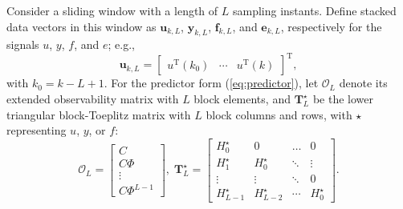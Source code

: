\documentclass[twocolumn]{autart}
\begin{document}
Consider a sliding window with a length of $L$ sampling instants. Define stacked data vectors in this window as $\mathbf{u}_{k,L}$, $\mathbf{y}_{k,L}$, $\mathbf{f}_{k,L}$, and $\mathbf{e}_{k,L}$, respectively for the signals $u$, $y$, $f$, and $e$; e.g.,
\begin{equation}\label{eq:ukL}
\mathbf{u}_{k,L} = \left[ \begin{array}{ccc}
                                  u^\mathrm{T}\left(k_0\right) & \cdots & u^\mathrm{T}\left(k\right)
                                \end{array} \right]^\mathrm{T},
\end{equation}
with $k_0 = k-L+1$. For the predictor form  (\ref{eq:predictor}), let $\mathcal{O}_L$ denote its extended observability matrix with $L$ block elements, and $\mathbf{T}_{L}^{\star}$ be the lower triangular block-Toeplitz matrix with $L$ block columns and rows, with $\star$ representing $u$, $y$, or $f$:
\begin{equation}\label{eq:OL_TLu}
\mathcal{O}_{L} = \left[ \begin{matrix}
                          C \\
                          C \Phi \\
                          \vdots \\
                          C \Phi^{L-1}
                        \end{matrix} \right], \;
\mathbf{T}_{L}^{\star} = \left[ \begin{matrix}
                          H_0^\star & 0 & \ldots & 0 \\
                          H_1^\star & H_0^\star & \ddots & \vdots \\
                          \vdots & \vdots & \ddots & 0  \\
                          H_{L-1}^\star & H_{L-2}^\star & \cdots & H_0^\star
                        \end{matrix} \right].
\end{equation}
\end{document}
